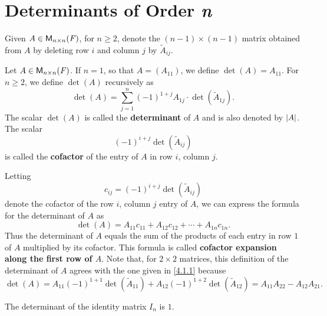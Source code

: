 \section{Determinants of Order \textit{n}}\label{sec:4.2}

\begin{defn}\label{4.2.1}
	Given \(A \in \ms[n][n][\F]\), for \(n \geq 2\), denote the \((n - 1) \times (n - 1)\) matrix obtained from \(A\) by deleting row \(i\) and column \(j\) by \(\tilde{A}_{i j}\).
\end{defn}

\begin{defn}\label{4.2.2}
	Let \(A \in \ms[n][n][\F]\).
	If \(n = 1\), so that \(A = (A_{1 1})\), we define \(\det(A) = A_{1 1}\).
	For \(n \geq 2\), we define \(\det(A)\) recursively as
	\[
		\det(A) = \sum_{j = 1}^n (-1)^{1 + j} A_{1 j} \cdot \det(\tilde{A}_{1 j}).
	\]
	The scalar \(\det(A)\) is called the \textbf{determinant} of \(A\) and is also denoted by \(\left\lvert A\right\rvert\).
	The scalar
	\[
		(-1)^{i + j} \det(\tilde{A}_{i j})
	\]
	is called the \textbf{cofactor} of the entry of \(A\) in row \(i\), column \(j\).

	Letting
	\[
		c_{i j} = (-1)^{i + j} \det(\tilde{A}_{i j})
	\]
	denote the cofactor of the row \(i\), column \(j\) entry of \(A\), we can express the formula for the determinant of \(A\) as
	\[
		\det(A) = A_{1 1} c_{1 1} + A_{1 2} c_{1 2} + \cdots + A_{1 n} c_{1 n}.
	\]
	Thus the determinant of \(A\) equals the sum of the products of each entry in row \(1\) of \(A\) multiplied by its cofactor.
	This formula is called \textbf{cofactor expansion along the first row of \(A\)}.
	Note that, for \(2 \times 2\) matrices, this definition of the determinant of \(A\) agrees with the one given in \cref{4.1.1} because
	\[
		\det(A) = A_{1 1} (-1)^{1 + 1} \det(\tilde{A}_{1 1}) + A_{1 2} (-1)^{1 + 2} \det(\tilde{A}_{1 2}) = A_{1 1} A_{2 2} - A_{1 2} A_{2 1}.
	\]
\end{defn}

\begin{eg}\label{4.2.3}
	The determinant of the identity matrix \(I_n\) is \(1\).
\end{eg}

